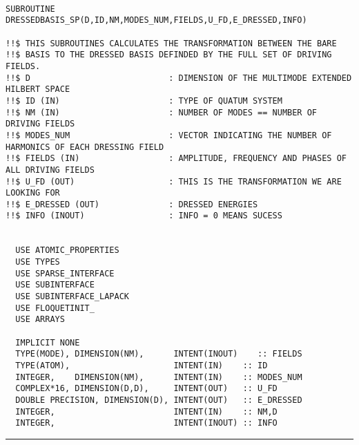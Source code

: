 \documentclass[10pt,a4paper]{article}
\begin{document}
\begin{verbatim}

SUBROUTINE DRESSEDBASIS_SP(D,ID,NM,MODES_NUM,FIELDS,U_FD,E_DRESSED,INFO)

!!$ THIS SUBROUTINES CALCULATES THE TRANSFORMATION BETWEEN THE BARE 
!!$ BASIS TO THE DRESSED BASIS DEFINDED BY THE FULL SET OF DRIVING FIELDS.
!!$ D                            : DIMENSION OF THE MULTIMODE EXTENDED HILBERT SPACE
!!$ ID (IN)                      : TYPE OF QUATUM SYSTEM
!!$ NM (IN)                      : NUMBER OF MODES == NUMBER OF DRIVING FIELDS
!!$ MODES_NUM                    : VECTOR INDICATING THE NUMBER OF HARMONICS OF EACH DRESSING FIELD
!!$ FIELDS (IN)                  : AMPLITUDE, FREQUENCY AND PHASES OF ALL DRIVING FIELDS
!!$ U_FD (OUT)                   : THIS IS THE TRANSFORMATION WE ARE LOOKING FOR
!!$ E_DRESSED (OUT)              : DRESSED ENERGIES
!!$ INFO (INOUT)                 : INFO = 0 MEANS SUCESS
               

  USE ATOMIC_PROPERTIES
  USE TYPES
  USE SPARSE_INTERFACE
  USE SUBINTERFACE
  USE SUBINTERFACE_LAPACK
  USE FLOQUETINIT_ 
  USE ARRAYS 

  IMPLICIT NONE
  TYPE(MODE), DIMENSION(NM),      INTENT(INOUT)    :: FIELDS
  TYPE(ATOM),                     INTENT(IN)    :: ID
  INTEGER,    DIMENSION(NM),      INTENT(IN)    :: MODES_NUM
  COMPLEX*16, DIMENSION(D,D),     INTENT(OUT)   :: U_FD
  DOUBLE PRECISION, DIMENSION(D), INTENT(OUT)   :: E_DRESSED
  INTEGER,                        INTENT(IN)    :: NM,D
  INTEGER,                        INTENT(INOUT) :: INFO
\end{verbatim}
\begin{center}
\rule{12cm}{1pt}
\end{center}
\end{document}

